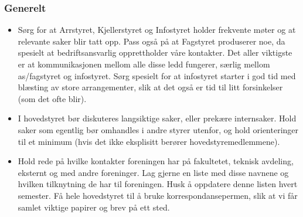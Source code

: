 \subsubsection{Generelt}
\begin{itemize}
\item Sørg for at Arrstyret, Kjellerstyret og Infostyret holder frekvente møter og at relevante saker blir tatt opp.
	Pass også på at Fagstyret produserer noe, da spesielt at bedriftsansvarlig opprettholder våre kontakter.
	Det aller viktigste er at kommunikasjonen mellom alle disse ledd fungerer, særlig mellom as/fagstyret
	og infostyret. Sørg spesielt for at infostyret starter i god tid med blæsting av store arrangementer,
	slik at det også er tid til litt forsinkelser (som det ofte blir).
\item I hovedstyret bør diskuteres langsiktige saker, eller prekære internsaker. Hold saker som egentlig bør
	omhandles i andre styrer utenfor, og hold orienteringer til et minimum (hvis det ikke eksplisitt berører
	hovedstyremedlemmene).
\item Hold rede på hvilke kontakter foreningen har på fakultetet, teknisk avdeling, eksternt og med andre foreninger.
	Lag gjerne en liste med disse navnene og hvilken tilknytning de har til foreningen.
	Husk å oppdatere denne listen hvert semester. Få hele hovedstyret til å bruke korrespondansepermen,
	slik at vi får samlet viktige papirer og brev på ett sted.


\end{itemize}
